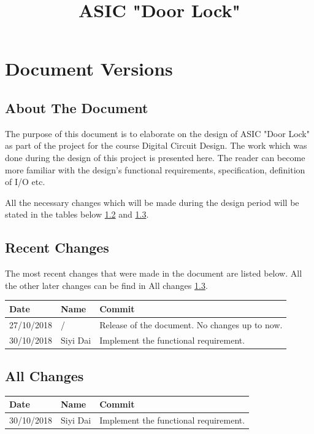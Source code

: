 \documentclass[a4paper, twoside]{report}
\title{ASIC "Door Lock"}
\begin{document}


\newpage
\tableofcontents
\newpage

\chapter{Document Versions}
\section{About The Document}
\begin{flushleft}
The purpose of this document is to elaborate on the design of ASIC "Door Lock" as part of the project for the course Digital Circuit Design. The work which was done during the design of this project is presented here. The reader can become more familiar with the design's functional requirements, specification, definition of I/O etc. \newline \par
All the necessary changes which will be made during the design period will be stated in the tables below \ref{recent} and \ref{All changes}.\par
\end{flushleft}
\section{Recent Changes}\label{recent}

The most recent changes that were made in the document are listed below. All the other later changes can be find in All changes \ref{All changes}. \par

\begin{flushleft}
    \begin{tabular}{ | l | l | p{11cm} |}
    \hline
    Date & Name & Commit \\ \hline
    27/10/2018 & / & Release of the document. No changes up to now. \\ \hline
    30/10/2018 & Siyi Dai & Implement the functional requirement. \\ \hline
    \end{tabular}
\end{flushleft}


\section{All Changes}\label{All changes}
\begin{flushleft}
    \begin{tabular}{ | l | l | p{11cm} |}
    \hline
    Date & Name & Commit \\ \hline
    30/10/2018 & Siyi Dai & Implement the functional requirement. \\ \hline
    \end{tabular}
\end{flushleft}
\end{document}
